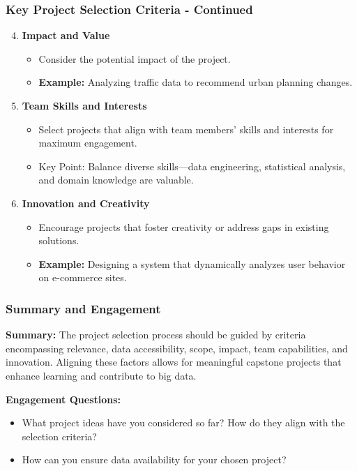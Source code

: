\documentclass[aspectratio=169]{beamer}
\begin{document}
\begin{frame}[fragile]
    \frametitle{Key Project Selection Criteria - Continued}
    \begin{enumerate}
        \setcounter{enumi}{3} %
        \item \textbf{Impact and Value}
        \begin{itemize}
            \item Consider the potential impact of the project.
            \item \textbf{Example:} Analyzing traffic data to recommend urban planning changes.
        \end{itemize}
        
        \item \textbf{Team Skills and Interests}
        \begin{itemize}
            \item Select projects that align with team members' skills and interests for maximum engagement.
            \item Key Point: Balance diverse skills—data engineering, statistical analysis, and domain knowledge are valuable.
        \end{itemize}

        \item \textbf{Innovation and Creativity}
        \begin{itemize}
            \item Encourage projects that foster creativity or address gaps in existing solutions.
            \item \textbf{Example:} Designing a system that dynamically analyzes user behavior on e-commerce sites.
        \end{itemize}
    \end{enumerate}
\end{frame}

\begin{frame}[fragile]
    \frametitle{Summary and Engagement}
    \textbf{Summary:} 
    The project selection process should be guided by criteria encompassing relevance, data accessibility, scope, impact, team capabilities, and innovation. Aligning these factors allows for meaningful capstone projects that enhance learning and contribute to big data.

    \textbf{Engagement Questions:}
    \begin{itemize}
        \item What project ideas have you considered so far? How do they align with the selection criteria?
        \item How can you ensure data availability for your chosen project?
    \end{itemize}
\end{frame}
\end{document}
